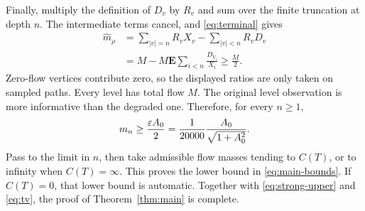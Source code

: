 Finally, multiply the definition of $D_v$ by $R_v$ and sum
over the finite truncation at depth $n$. The intermediate terms
cancel, and \eqref{eq:terminal} gives
\begin{align*}
 \widehat m_\rho
 &=\sum_{|v|=n}R_vX_v-\sum_{|v|<n}R_vD_v\\
 &=M-M\mathbf E\sum_{i<n}\frac{D_{V_i}}{X_i}
 \geq\frac M2.
\end{align*}
Zero-flow vertices contribute zero, so the displayed ratios are only
taken on sampled paths. Every level has total flow $M$.
The original level observation is more informative than the degraded
one. Therefore, for every $n\geq1$,
\[
 m_n\geq\frac{\varepsilon A_0}{2}
       =\frac1{20000}\frac{A_0}{\sqrt{1+A_0^2}}.
\]
Pass to the limit in $n$, then take admissible flow masses tending
to $C(T)$, or to infinity when $C(T)=\infty$. This proves the lower
bound in \eqref{eq:main-bounds}. If $C(T)=0$, that lower bound is
automatic. Together with \eqref{eq:strong-upper} and
\eqref{eq:tv}, the proof of Theorem~\ref{thm:main} is complete.

